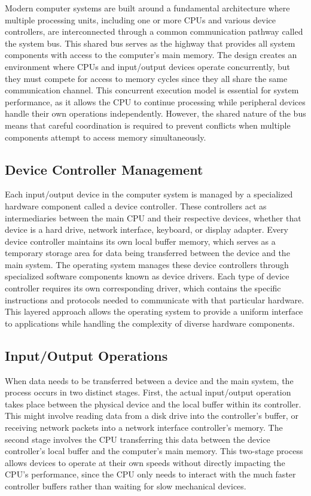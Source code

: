     Modern computer systems are built around a fundamental architecture where multiple processing units, including one or more CPUs and various device controllers, are interconnected through a common communication pathway called the system bus. This shared bus serves as the highway that provides all system components with access to the computer's main memory. The design creates an environment where CPUs and input/output devices operate concurrently, but they must compete for access to memory cycles since they all share the same communication channel.
    This concurrent execution model is essential for system performance, as it allows the CPU to continue processing while peripheral devices handle their own operations independently. However, the shared nature of the bus means that careful coordination is required to prevent conflicts when multiple components attempt to access memory simultaneously.


    \subsection{Device Controller Management}

    Each input/output device in the computer system is managed by a specialized hardware component called a device controller. These controllers act as intermediaries between the main CPU and their respective devices, whether that device is a hard drive, network interface, keyboard, or display adapter. Every device controller maintains its own local buffer memory, which serves as a temporary storage area for data being transferred between the device and the main system.
    The operating system manages these device controllers through specialized software components known as device drivers. Each type of device controller requires its own corresponding driver, which contains the specific instructions and protocols needed to communicate with that particular hardware. This layered approach allows the operating system to provide a uniform interface to applications while handling the complexity of diverse hardware components.


    \subsection{Input/Output Operations}

    When data needs to be transferred between a device and the main system, the process occurs in two distinct stages. First, the actual input/output operation takes place between the physical device and the local buffer within its controller. This might involve reading data from a disk drive into the controller's buffer, or receiving network packets into a network interface controller's memory.
    The second stage involves the CPU transferring this data between the device controller's local buffer and the computer's main memory. This two-stage process allows devices to operate at their own speeds without directly impacting the CPU's performance, since the CPU only needs to interact with the much faster controller buffers rather than waiting for slow mechanical devices.


